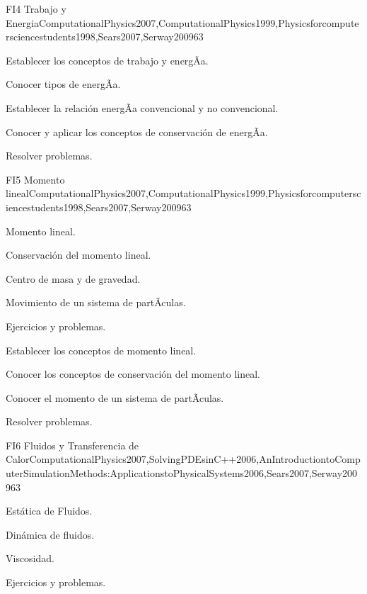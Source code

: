 \begin{syllabus}
\begin{unit}{FI4 Trabajo y Energia}{ComputationalPhysics2007,ComputationalPhysics1999,Physicsforcomputersciencestudents1998,Sears2007,Serway2009}{6}{3}
   \begin{learningoutcomes}
      \item Establecer los conceptos de trabajo y energÃ­a.
      \item Conocer tipos de energÃ­a.
      \item Establecer la relación energÃ­a convencional y no convencional.
      \item Conocer y aplicar los conceptos de conservación de energÃ­a.
      \item Resolver problemas.
   \end{learningoutcomes}
\end{unit}

\begin{unit}{FI5 Momento lineal}{ComputationalPhysics2007,ComputationalPhysics1999,Physicsforcomputersciencestudents1998,Sears2007,Serway2009}{6}{3}
\begin{topics}
      \item Momento lineal.
      \item Conservación del momento lineal.
      \item Centro de masa y de gravedad.
      \item Movimiento de un sistema de partÃ­culas.
      \item Ejercicios y problemas.
  \end{topics}

   \begin{learningoutcomes}
      \item Establecer los conceptos de momento lineal.
      \item Conocer los conceptos de conservación del momento lineal.
      \item Conocer el momento de un sistema de partÃ­culas.
      \item Resolver problemas.
   \end{learningoutcomes}
\end{unit}

\begin{unit}{FI6 Fluidos y Transferencia de Calor}{ComputationalPhysics2007,SolvingPDEsinC++2006,AnIntroductiontoComputerSimulationMethods:ApplicationstoPhysicalSystems2006,Sears2007,Serway2009}{6}{3}
\begin{topics}
      \item Estática de Fluidos.
      \item Dinámica de fluidos. 
      \item Viscosidad.
      \item Ejercicios y problemas.
  \end{topics}


\end{unit}
\end{syllabus}
